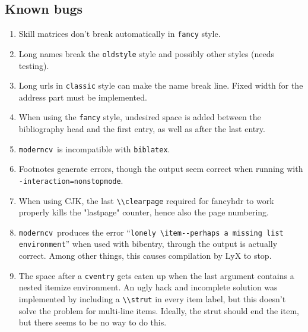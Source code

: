 \documentclass[a4paper,11pt]{article}
\newcommand{\code}[1]{\lstinline!#1!}
\newcommand{\Code}[1]{\lstinline!#1!~} %
\newcommand{\Moderncv}{\Code{moderncv}}
\begin{document}
\subsection{Known bugs}
\begin{enumerate}
  \item Skill matrices don't break automatically in \texttt{fancy} style.
  \item Long names break the \texttt{oldstyle} style and possibly other styles (needs testing).
  \item Long urls in \texttt{classic} style can make the name break line.
  Fixed width for the address part must be implemented.
  \item When using the \texttt{fancy} style, undesired space is added between the bibliography head and the first entry, as well as after the last entry.
  \item \Moderncv is incompatible with \texttt{biblatex}.
  \item Footnotes generate errors, though the output seem correct when running with\\\texttt{-interaction=nonstopmode}.
  \item When using CJK, the last \code{\\clearpage} required for fancyhdr to work properly kills the "lastpage" counter, hence also the page numbering.
  \item \Moderncv produces the error ``\texttt{lonely \textbackslash item-{}-perhaps a missing list\\environment}'' when used with bibentry, through the output is actually correct.
  Among other things, this causes compilation by LyX to stop.
  \item The space after a \texttt{cventry} gets eaten up when the last argument contains a nested itemize environment.
  An ugly hack and incomplete solution was implemented by including a \code{\\strut} in every item label, but this doesn't solve the problem for multi-line items.
  Ideally, the strut should end the item, but there seems to be no way to do this.
\end{enumerate}
\end{document}
